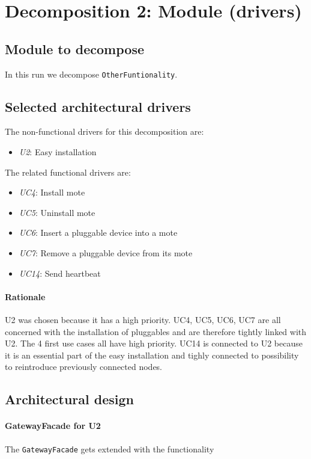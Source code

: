 \documentclass[english]{sareport}
\begin{document}
\section{Decomposition 2: Module (drivers)}
\subsection{Module to decompose}
In this run we decompose \texttt{OtherFuntionality}.
\subsection{Selected architectural drivers}
The non-functional drivers for this decomposition are:

\begin{itemize}
	\item \emph{U2}: Easy installation
\end{itemize}

The related functional drivers are:

\begin{itemize}
	\item \emph{UC4}: Install mote
	\item \emph{UC5}: Uninstall mote
	\item \emph{UC6}: Insert a pluggable device into a mote
	\item \emph{UC7}: Remove a pluggable device from its mote
	\item \emph{UC14}: Send heartbeat
\end{itemize}

\paragraph{Rationale}
U2 was chosen because it has a high priority. UC4, UC5, UC6, UC7 are all concerned with the installation of pluggables and are therefore tightly linked with U2. The 4 first use cases all have high priority. UC14 is connected to U2 because it is an essential part of the easy installation and tighly connected to possibility to reintroduce previously connected nodes.
\subsection{Architectural design}
\paragraph{GatewayFacade for U2}
The \texttt{GatewayFacade} gets extended with the functionality 
\end{document}
